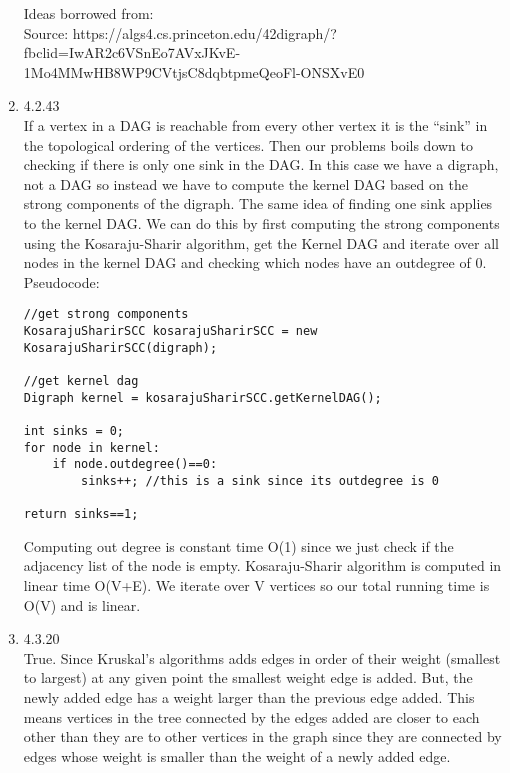 \documentclass[11pt,fleqn]{article}
\begin{document}
\begin{enumerate}
Ideas borrowed from:\\
Source: https://algs4.cs.princeton.edu/42digraph/?fbclid=IwAR2c6VSnEo7AVxJKvE-1Mo4MMwHB8WP9CVtjsC8dqbtpmeQeoFl-ONSXvE0


\item 4.2.43\\
If a vertex in a DAG is reachable from every other vertex it is the ``sink'' in the topological ordering of the vertices. Then our problems boils down to checking if there is only one sink in the DAG. In this case we have a digraph, not a DAG so instead we have to compute the kernel DAG based on the strong components of the digraph. The same idea of finding one sink applies to the kernel DAG. We can do this by first computing the strong components using the Kosaraju-Sharir algorithm, get the Kernel DAG and iterate over all nodes in the kernel DAG and checking which nodes have an outdegree of 0. Pseudocode:\\

\begin{verbatim}
//get strong components
KosarajuSharirSCC kosarajuSharirSCC = new KosarajuSharirSCC(digraph);

//get kernel dag
Digraph kernel = kosarajuSharirSCC.getKernelDAG();

int sinks = 0;
for node in kernel:
    if node.outdegree()==0:
        sinks++; //this is a sink since its outdegree is 0

return sinks==1;    	
\end{verbatim}

Computing out degree is constant time O(1) since we just check if the adjacency list of the node is empty. Kosaraju-Sharir algorithm is computed in linear time O(V+E). We iterate over V vertices so our total running time is O(V) and is linear.

\item 4.3.20\\
True. Since Kruskal's algorithms adds edges in order of their weight (smallest to largest) at any given point the smallest weight edge is added. But, the newly added edge has a weight larger than the previous edge added. This means vertices in the tree connected by the edges added are closer to each other than they are to other vertices in the graph since they are connected by edges whose weight is smaller than the weight of a newly added edge.


\end{enumerate}
\end{document}
